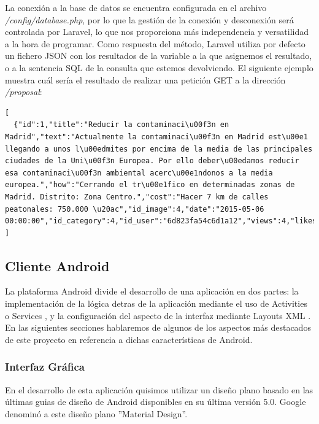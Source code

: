 La conexión a la base de datos se encuentra configurada en el archivo \textit{/config/database.php}, por lo que la gestión de la conexión y desconexión será controlada por Laravel, lo que nos proporciona más independencia y versatilidad a la hora de programar. Como respuesta del método, Laravel utiliza por defecto un fichero JSON con los resultados de la variable a la que asignemos el resultado, o a la sentencia SQL de la consulta que estemos devolviendo. El siguiente ejemplo muestra cuál sería el resultado de realizar una petición GET a la dirección \textit{/proposal}:

\lstset{
  language        = c,    inputencoding=utf8}
\begin{lstlisting}[frame=single]
[
  {"id":1,"title":"Reducir la contaminaci\u00f3n en Madrid","text":"Actualmente la contaminaci\u00f3n en Madrid est\u00e1 llegando a unos l\u00edmites por encima de la media de las principales ciudades de la Uni\u00f3n Europea. Por ello deber\u00edamos reducir esa contaminaci\u00f3n ambiental acerc\u00e1ndonos a la media europea.","how":"Cerrando el tr\u00e1fico en determinadas zonas de Madrid. Distrito: Zona Centro.","cost":"Hacer 7 km de calles peatonales: 750.000 \u20ac","id_image":4,"date":"2015-05-06 00:00:00","id_category":4,"id_user":"6d823fa54c6d1a12","views":4,"likes":3,"not_understood":0,"dislikes":0}
]
\end{lstlisting}

\subsection{Cliente Android}

	La plataforma Android divide el desarrollo de una aplicación en dos partes: la implementación de la lógica detras de la aplicación mediante el uso de Activities \cite{ref:android_activities} o Services \cite{ref:android_service}, y la configuración del aspecto de la interfaz mediante Layouts XML \cite{ref:android_layout}. En las siguientes secciones hablaremos de algunos de los aspectos más destacados de este proyecto en referencia a dichas características de Android.

	\subsubsection{Interfaz Gráfica}
	
		En el desarrollo de esta aplicación quisimos utilizar un diseño plano basado en las últimas guias de diseño de Android disponibles en su última versión 5.0. Google denominó a este diseño plano ''Material Design''. 
	

